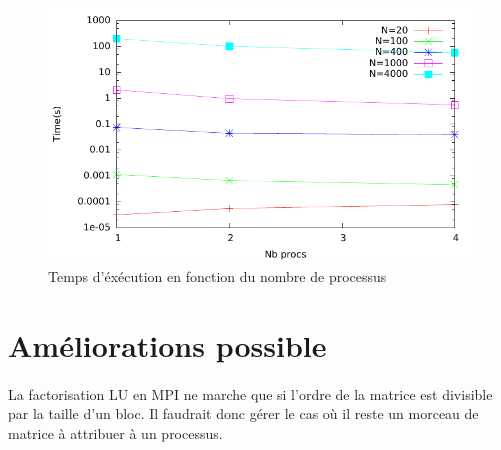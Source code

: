 \documentclass{article}
\begin{document}
\newpage
\begin{figure}[ht]
  \centering
  \includegraphics[scale=0.7]{curves/data/mpi.pdf}
  \caption{\label{fig:mpi} Temps d'éxécution en fonction du nombre de processus}
\end{figure}


\section{Améliorations possible}

\paragraph{}La factorisation LU en MPI ne marche que si l'ordre de la matrice est divisible par la taille d'un bloc. Il faudrait donc gérer le cas où il reste un morceau de matrice à attribuer à un processus.
\end{document}

